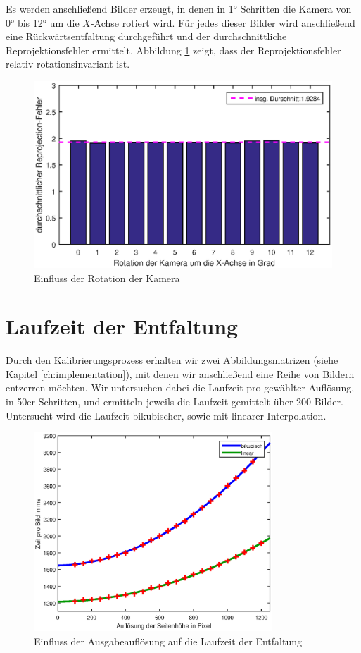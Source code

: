 Es werden anschließend Bilder erzeugt, in denen in 1° Schritten die Kamera von 0° bis 12° um die $X$-Achse rotiert wird. Für jedes dieser Bilder wird anschließend eine Rückwärtsentfaltung durchgeführt und der durchschnittliche Reprojektionsfehler ermittelt. Abbildung \ref{fig:influenceRot} zeigt, dass der Reprojektionsfehler relativ rotationsinvariant ist. 


\begin{figure}[!htb]
	\centering
	\includegraphics[width=\textwidth]{images/reprojectionErrorDeg2.eps}
	\caption{Einfluss der Rotation der Kamera}
	\label{fig:influenceRot}
\end{figure}


\section{Laufzeit der Entfaltung}
Durch den Kalibrierungsprozess erhalten wir zwei Abbildungsmatrizen (siehe Kapitel \ref{ch:implementation}), mit denen wir anschließend eine Reihe von Bildern entzerren möchten. Wir untersuchen dabei die Laufzeit pro gewählter Auflösung, in 50er Schritten, und ermitteln jeweils die Laufzeit gemittelt über 200 Bilder. Untersucht wird die Laufzeit bikubischer, sowie mit linearer Interpolation. 

\begin{figure}[!htb]
	\centering
	\includegraphics[width=0.8\textwidth]{images/runningTimePerSlantheight.eps}
	\caption{Einfluss der Ausgabeauflösung auf die Laufzeit der Entfaltung}
	\label{fig:influenceRes2}
\end{figure}

